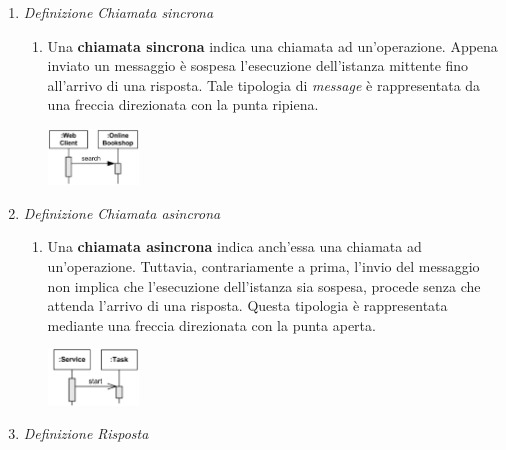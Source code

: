\documentclass{article}
\begin{document}
\begin{enumerate}
    \renewcommand{\labelenumi}{-}
    \itemsep0em
    \item \textit{Definizione Chiamata sincrona} \begin{enumerate}[label={}]
                                \item Una \textbf{chiamata sincrona} indica una chiamata ad un'operazione. Appena inviato un messaggio è sospesa l'esecuzione dell'istanza mittente fino all'arrivo di una risposta. Tale tipologia di \textit{message} è rappresentata da una freccia direzionata con la punta ripiena.\vspace*{14pt}
                                    \begin{center}
                                        \includegraphics[width=0.2\textwidth]{foto 4.png}\\
                                    \end{center}
                            \end{enumerate}
    \item \textit{Definizione Chiamata asincrona} \begin{enumerate}[label={}]
                                \item Una \textbf{chiamata asincrona} indica anch'essa una chiamata ad un'operazione. Tuttavia, contrariamente a prima, l'invio del messaggio non implica che l'esecuzione dell'istanza sia sospesa, procede senza che attenda l'arrivo di una risposta. Questa tipologia è rappresentata mediante una freccia direzionata con la punta aperta.\vspace*{14pt}
                                    \begin{center}
                                        \includegraphics[width=0.2\textwidth]{foto 5.png}\\
                                    \end{center}
                            \end{enumerate}
    \item \textit{Definizione Risposta}  \begin{enumerate}[label={}]

\end{enumerate}
\end{enumerate}
\end{document}
